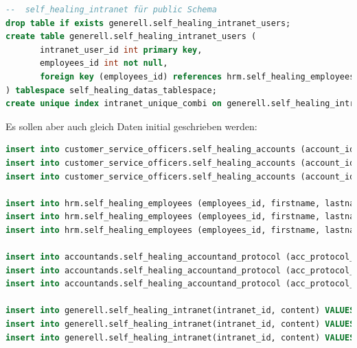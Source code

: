 \begin{lstlisting}[language=sql, caption=Patroni - Self Healing Tests - CREATE-SQL,captionpos=b,label={lst:patroni-self-healing-create-sql},breaklines=true]
--  self_healing_intranet für public Schema
drop table if exists generell.self_healing_intranet_users;
create table generell.self_healing_intranet_users (
       intranet_user_id int primary key,
       employees_id int not null,
       foreign key (employees_id) references hrm.self_healing_employees(employees_id) on update restrict on delete restrict
) tablespace self_healing_datas_tablespace;
create unique index intranet_unique_combi on generell.self_healing_intranet_users(intranet_user_id, employees_id) tablespace self_healing_indices_tablespace;
\end{lstlisting}

Es sollen aber auch gleich Daten initial geschrieben werden:
\lstset{style=gra_codestyle}
\begin{lstlisting}[language=sql, caption=Patroni - Self Healing Tests - Init Data,captionpos=b,label={lst:patroni-self-healing-init-data},breaklines=true]
insert into customer_service_officers.self_healing_accounts (account_id, firstname, lastname, birthday) VALUES (100, 'a', 'b', '01.01.2000');
insert into customer_service_officers.self_healing_accounts (account_id, firstname, lastname, birthday) VALUES (200, 'c', 'd', '01.01.2000');
insert into customer_service_officers.self_healing_accounts (account_id, firstname, lastname, birthday) VALUES (300, 'f', 'g', '01.01.2000');

insert into hrm.self_healing_employees (employees_id, firstname, lastname, birthday) VALUES (100, 'a', 'b', '01.01.2000');
insert into hrm.self_healing_employees (employees_id, firstname, lastname, birthday) VALUES (200, 'c', 'd', '01.01.2000');
insert into hrm.self_healing_employees (employees_id, firstname, lastname, birthday) VALUES (300, 'f', 'g', '01.01.2000');

insert into accountands.self_healing_accountand_protocol (acc_protocol_id, description, protocol_date, employees_id, rapport)  values (100, 'bla', '07.04.2024', 100, 'blabla');
insert into accountands.self_healing_accountand_protocol (acc_protocol_id, description, protocol_date, employees_id, rapport)  values (200, 'yada', '07.04.2024', 100, 'ydayadyada');
insert into accountands.self_healing_accountand_protocol (acc_protocol_id, description, protocol_date, employees_id, rapport)  values (300, 'something', '07.04.2024', 300, 'something');

insert into generell.self_healing_intranet(intranet_id, content) VALUES (100, 'yadada');
insert into generell.self_healing_intranet(intranet_id, content) VALUES (500, 'bla bla');
insert into generell.self_healing_intranet(intranet_id, content) VALUES (1000, 'talking and talking');


\end{lstlisting}
